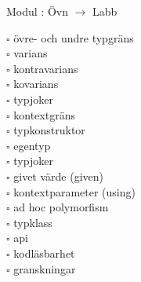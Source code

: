 
    Modul : Övn  $\rightarrow$ Labb 
    \begin{multicols}{3}\SlideFontTiny
    $\square$ övre- och undre typgräns \\
$\square$ varians \\
$\square$ kontravarians \\
$\square$ kovarians \\
$\square$ typjoker \\
$\square$ kontextgräns \\
$\square$ typkonstruktor \\
$\square$ egentyp \\
$\square$ typjoker \\
$\square$ givet värde (given) \\
$\square$ kontextparameter (using) \\
$\square$ ad hoc polymorfism \\
$\square$ typklass \\
$\square$ api \\
$\square$ kodläsbarhet \\
$\square$ granskningar \\
    \end{multicols}
    